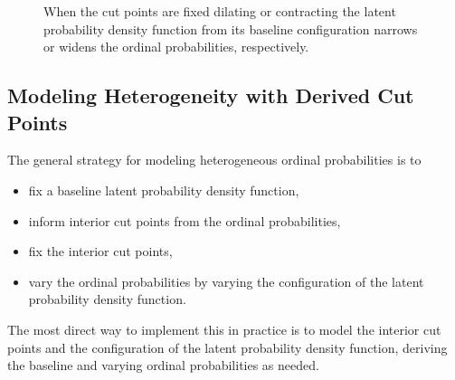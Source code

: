 \documentclass[
  letterpaper,
  DIV=11,
  numbers=noendperiod]{scrartcl}
\providecommand{\tightlist}{%
  \setlength{\itemsep}{0pt}\setlength{\parskip}{0pt}}\usepackage{longtable,booktabs,array}
\begin{document}
\begin{figure}


\caption{\label{fig-latent-density-scale}When the cut points are fixed
dilating or contracting the latent probability density function from its
baseline configuration narrows or widens the ordinal probabilities,
respectively.}

\end{figure}%

\subsection{Modeling Heterogeneity with Derived Cut
Points}\label{derived-cuts}

The general strategy for modeling heterogeneous ordinal probabilities is
to

\begin{itemize}
\tightlist
\item
  fix a baseline latent probability density function,
\item
  inform interior cut points from the ordinal probabilities,
\item
  fix the interior cut points,
\item
  vary the ordinal probabilities by varying the configuration of the
  latent probability density function.
\end{itemize}

The most direct way to implement this in practice is to model the
interior cut points and the configuration of the latent probability
density function, deriving the baseline and varying ordinal
probabilities as needed.
\end{document}
